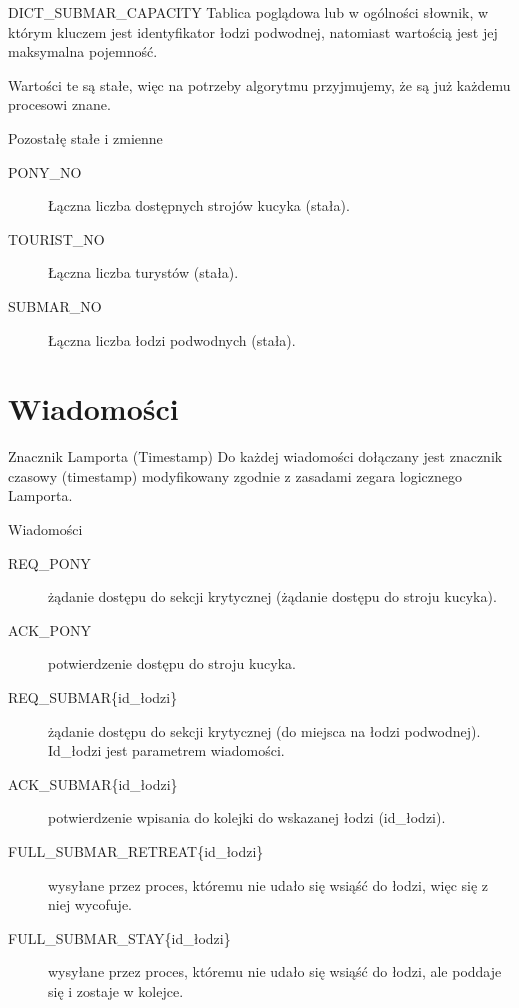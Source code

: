 \documentclass{beamer}
\begin{document}
\begin{frame}{DICT\_SUBMAR\_CAPACITY}
    \internallinenumbers
    \resetlinenumber[1]
    Tablica poglądowa lub w ogólności słownik, w którym kluczem jest identyfikator łodzi podwodnej, natomiast wartością jest jej maksymalna pojemność.

    \vspace{0.4cm}
    Wartości te są stałe, więc na potrzeby algorytmu przyjmujemy, że są już każdemu procesowi znane.
\end{frame}


\begin{frame}{Pozostałę stałe i zmienne}
    \begin{description}
        \item [PONY\_NO] Łączna liczba dostępnych strojów kucyka (stała).
        \item [TOURIST\_NO] Łączna liczba turystów (stała).
        \item [SUBMAR\_NO] Łączna liczba łodzi podwodnych (stała).
    \end{description}

\end{frame}

\section{Wiadomości}
\begin{frame}{Znacznik Lamporta (Timestamp)}
    \internallinenumbers
    \resetlinenumber[1]
    Do każdej wiadomości dołączany jest znacznik czasowy (timestamp) modyfikowany zgodnie z zasadami zegara logicznego Lamporta.
\end{frame}

\begin{frame}{Wiadomości}
    \internallinenumbers
    \resetlinenumber[1]
    \begin{description}
        \item [REQ\_PONY] żądanie dostępu do sekcji krytycznej (żądanie dostępu do stroju kucyka).
        \item [ACK\_PONY] potwierdzenie dostępu do stroju kucyka.
        \item [REQ\_SUBMAR\{id\_łodzi\}] żądanie dostępu do sekcji krytycznej (do miejsca na łodzi podwodnej). Id\_łodzi jest parametrem wiadomości.
        \item [ACK\_SUBMAR\{id\_łodzi\}] potwierdzenie wpisania do kolejki do wskazanej łodzi (id\_łodzi).
        \item [FULL\_SUBMAR\_RETREAT\{id\_łodzi\}] wysyłane przez proces, któremu nie udało się wsiąść do łodzi, więc się z niej wycofuje.
        \item [FULL\_SUBMAR\_STAY\{id\_łodzi\}] wysyłane przez proces, któremu nie udało się wsiąść do łodzi, ale poddaje się i zostaje w kolejce.
    \end{description}
\end{frame}
\end{document}
